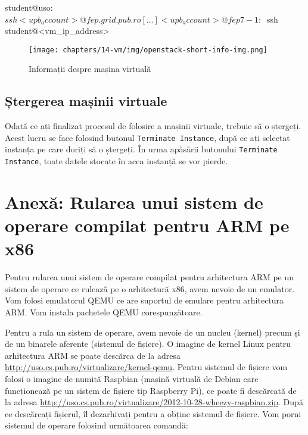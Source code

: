 \begin{screen}[caption={Accesarea mașinii virtuale prin intermediul fep.grid.pub.ro},label={lst:vm:access-vm}]
student@uso:~$ ssh <upb_account>@fep.grid.pub.ro
[...]
<upb_account>@fep7-1:~$ ssh student@<vm_ip_address>
\end{screen}

\begin{figure}[!htbp]
  \centering
  \texttt{[image: chapters/14-vm/img/openstack-short-info-img.png]}
  \caption{Informații despre mașina virtuală}
  \label{fig:vm:openstack-info}
\end{figure}

\subsection{Ștergerea mașinii virtuale}
\label{sec:vm:openstack:vm-delete}

Odată ce ați finalizat procesul de folosire a mașinii virtuale, trebuie să o ștergeți.
Acest lucru se face folosind butonul \texttt{Terminate Instance}, după ce ați selectat instanța pe care doriți să o ștergeți.
În urma apăsării butonului \texttt{Terminate Instance}, toate datele stocate în acea instanță se vor pierde.

\section{Anexă: Rularea unui sistem de operare compilat pentru ARM pe x86}
\label{sec:vm:arm}

Pentru rularea unui sistem de operare compilat pentru arhitectura ARM pe un sistem de operare ce rulează pe o arhitectură x86, avem nevoie de un emulator.
 Vom folosi emulatorul QEMU ce are suportul de emulare pentru arhitectura ARM.
 Vom instala pachetele QEMU corespunzătoare.


Pentru a rula un sistem de operare, avem nevoie de un nucleu (kernel) precum și de un binarele aferente (sistemul de fișiere).
O imagine de kernel Linux pentru arhitectura ARM se poate descărca de la adresa \url{http://uso.cs.pub.ro/virtualizare/kernel-qemu}.
Pentru sistemul de fișiere vom folosi o imagine de numită Raspbian (mașină virtuală de Debian care funcționează pe un sistem de fișiere tip Raspberry Pi), ce poate fi descărcată de la adresa \url{http://uso.cs.pub.ro/virtualizare/2012-10-28-wheezy-raspbian.zip}.
După ce descărcați fișierul, îl dezarhivați pentru a obține sistemul de fișiere.
Vom porni sistemul de operare folosind următoarea comandă:


